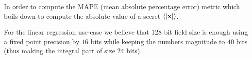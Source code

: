 In order to compute the MAPE (mean absolute percentage error) metric which boils down to compute
the absolute value of a secret $\langle {|\mathbf{x}|} \rangle$.











For the linear regression use-case we believe that $128$ bit field size is
enough using a fixed point precision by $16$ bits while keeping the numbers
magnitude to $40$ bits (thus making the integral part of size $24$ bits).


